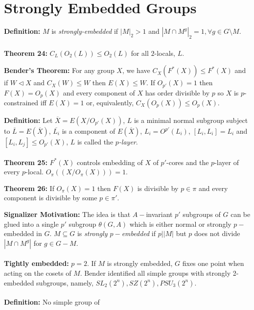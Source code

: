 \section {Strongly Embedded Groups}
{\bf Definition:}  $M$ is \emph{strongly-embedded} if
$|M|_2 > 1$ and $|M \cap M^g|_2=1, \forall g \in G \setminus M$.
\\
\\
{\bf Theorem 24:}
$C_L(O_2(L)) \le O_2(L)$ for all
$2$-locals, $L$.
\begin{quote}
\end{quote}
{\bf Bender's Theorem:} For any group $X$, we have $C_X(F^*(X)) \le F^*(X)$ and if
$W \lhd X$ and $C_X(W) \le W$ then $E(X) \le W$.  If $O_{p'}(X)=1$ then
$F(X)=O_p(X)$ and every component of $X$ has order divisible by $p$ so
$X$ is $p$-constrained iff $E(X)=1$ or, equivalently, $C_X(O_p(X)) \le O_p(X)$.
\begin{quote}
\end{quote}
{\bf Definition:}
Let ${\overline X}= E(X/O_{p'}(X))$, $L$ is a minimal normal subgroup subject to ${\overline L}= E({\overline X})$,
${\overline {L_i}}$ is a component of $E({\overline X})$, $L_i= O^{p'}(L_i)$,
$[L_i, L_i]= L_i$ and $[L_i, L_j] \le O_{p'}(X)$, $L$ is called the \emph{ $p$-layer}. \\
\\
{\bf Theorem 25:}
$F^*(X)$ controls embedding of $X$ of
$p'$-cores and the $p$-layer of every $p$-local.  $O_{\pi}((X/O_{\pi}(X)))=1$.
\begin{quote}
\end{quote}
{\bf Theorem 26:}
If $O_{\pi}(X)=1$ then $F(X)$ is divisible by $p \in \pi$ and every component is
divisible by some $p \in \pi'$.
\begin{quote}
\end{quote}
{\bf Signalizer Motivation:}  The idea is that
$A-$invariant $p'$ subgroups of $G$ can be glued into a single $p'$
subgroup $\theta(G,A)$ which is either normal or strongly $p-$embedded in $G$.
$M \subseteq G$ is \emph{ strongly $p-$embedded} if $p | |M|$ but $p$ does not divide
$|M \cap M^g |$ for $g \in G-M$.
\\
\\
{\bf Tightly embedded:} $p=2$. If $M$ is strongly
embedded, $G$ fixes one point when acting on the cosets of $M$.
Bender identified all simple groups with strongly 2-embedded subgroups, namely,
$SL_2(2^n), SZ(2^n), PSU_3(2^n)$.
\\
\\
{\bf Definition:}
No simple group of
